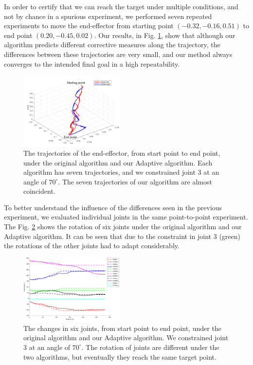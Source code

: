 \documentclass{ieeeaccess}
\newcommand{\degree}{^\circ}
\begin{document}

In order to certify that we can reach the target under multiple conditions, and not by chance in a spurious experiment, we performed seven repeated experiments to move the end-effector from starting point $(-0.32,-0.16,0.51)$ to end point $(0.	20, -0.45, 0.02)$. Our results, in Fig. \ref{f5}, show that although our algorithm predicts different corrective measures along the trajectory, the differences between these trajectories are very small, and our method always converges to the intended final goal in a high repeatability.

\begin{figure}[tb!]
	\centering
	\includegraphics[width=0.47\textwidth]{img/f5.pdf} \caption{The trajectories of the end-effector, from start point to end point, under the original algorithm and our Adaptive algorithm. Each algorithm has seven trajectories, and we constrained joint 3 at an angle of $70 \degree$.  The seven trajectories of our algorithm are almost coincident. 	}
	\label{f5}
\end{figure}

To better understand the influence of the differences seen in the previous experiment, we evaluated individual joints in the same point-to-point experiment. The Fig. \ref{f6} shows the rotation of six joints under the original algorithm and our Adaptive algorithm. It can be seen that due to the constraint in joint 3 (green) the rotations of the other joints had to adapt considerably. 



\begin{figure}[tb!] \centering \includegraphics[width=0.47\textwidth]{img/f6.pdf} \caption{ The changes in six joints, from start point to end point, under the original algorithm and our Adaptive algorithm. We constrained joint 3 at an angle of $70 \degree$. The rotation of joints are different under the two algorithms, but eventually they reach the same target point.	}
	\label{f6}
\end{figure}
\end{document}
